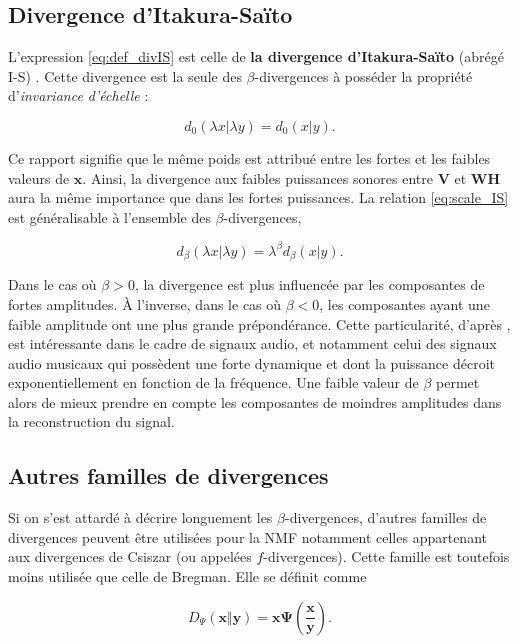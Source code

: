 \subsection{Divergence d'Itakura-Saïto}\label{part:div_IS}
L'expression \ref{eq:def_divIS} est celle de \textbf{la divergence d'Itakura-Saïto} (abrégé I-S) \cite{itakura1968analysis, bertin_les_2009}. Cette divergence est la seule des $\beta$-divergences à posséder la propriété d'\textit{invariance d'échelle} :

\begin{equation}\label{eq:scale_IS}
d_{0}(\lambda x \vert \lambda y) = d_{0}(x \vert y).
\end{equation}

Ce rapport signifie que le même poids est attribué entre les fortes et les faibles valeurs de $\mathbf{x}$. Ainsi, la divergence aux faibles puissances sonores entre $\textbf{V}$ et $\textbf{WH}$ aura la même importance que dans les fortes puissances. La relation \ref{eq:scale_IS} est généralisable à l'ensemble des $\beta$-divergences,

\begin{equation}
d_{\beta}(\lambda x \vert \lambda y) = \lambda^{\beta}d_{\beta}(x \vert y).
\end{equation}


Dans le cas où $\beta > 0$, la divergence est plus influencée par les composantes de fortes amplitudes. À l'inverse, dans le cas où $\beta < 0$, les composantes ayant une faible amplitude ont une plus grande prépondérance. Cette particularité, d'après \cite{fevotte_nonnegative_2009}, est intéressante dans le cadre de signaux audio, et notamment celui des signaux audio musicaux qui possèdent une forte dynamique et dont la puissance décroit exponentiellement en fonction de la fréquence. Une faible valeur de $\beta$ permet alors de mieux prendre en compte les composantes de moindres amplitudes dans la reconstruction du signal.

\subsection{Autres familles de divergences}
Si on s'est attardé à décrire longuement les $\beta$-divergences, d'autres familles de divergences peuvent être utilisées pour la NMF notamment celles appartenant aux divergences de Csiszar (ou appelées $f$-divergences). Cette famille est toutefois moins utilisée que celle de Bregman. Elle se définit comme

\begin{equation}
D_{\Psi} (\mathbf{x} \Vert\mathbf{y}) = \mathbf{x} \mathbf{\Psi} \left( \frac{\mathbf{x}}{\mathbf{y}}\right).
\end{equation}

